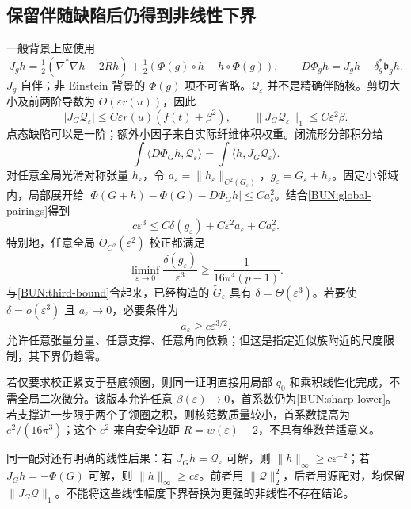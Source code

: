 \documentclass[UTF8,fontset=fandol,zihao=-4,oneside,openany]{ctexbook}
\theoremstyle{cjkplain}
\numberwithin{equation}{chapter}
\begin{document}
\subsection{保留伴随缺陷后仍得到非线性下界}
一般背景上应使用
\begin{equation}
 J_gh=\tfrac12(\nabla^*\nabla h-2\mathring Rh)
 +\tfrac12(\Phi(g)\circ h+h\circ\Phi(g)),
 \qquad D\Phi_g h=J_gh-\delta_g^*\mathfrak b_gh.
 \label{BUN:J-general}
\end{equation}
$J_g$ 自伴；非 Einstein 背景的 $\Phi(g)$ 项不可省略。$\mathcal Q_\varepsilon$ 并不是精确伴随核。剪切大小及前两阶导数为 $O(\varepsilon r(u))$，因此
\[
 |J_G\mathcal Q_\varepsilon|\le C\varepsilon r(u)(f(t)+\beta^2),
 \qquad\|J_G\mathcal Q_\varepsilon\|_1\le C\varepsilon^2\beta.
\]
点态缺陷可以是一阶；额外小因子来自实际纤维体积权重。闭流形分部积分给
\[
 \int\langle D\Phi_Gh,\mathcal Q_\varepsilon\rangle
 =\int\langle h,J_G\mathcal Q_\varepsilon\rangle.
\]
对任意全局光滑对称张量 $h_\varepsilon$，令
$a_\varepsilon=\|h_\varepsilon\|_{C^2(G_\varepsilon)}$，$g_\varepsilon=G_\varepsilon+h_\varepsilon$。固定小邻域内，局部展开给
$|\Phi(G+h)-\Phi(G)-D\Phi_Gh|\le Ca_\varepsilon^2$。结合\eqref{BUN:global-pairings}得到
\begin{equation}
 \boxed{c\varepsilon^3\le C\delta(g_\varepsilon)
 +C\varepsilon^2a_\varepsilon+Ca_\varepsilon^2.}
 \label{BUN:nonlinear-obstruction}
\end{equation}
特别地，任意全局 $O_{C^2}(\varepsilon^2)$ 校正都满足
\begin{equation}
 \boxed{\liminf_{\varepsilon\to0}\frac{\delta(g_\varepsilon)}{\varepsilon^3}
 \ge\frac1{16\pi^4(p-1)}.}
 \label{BUN:sharp-lower}
\end{equation}
与\eqref{BUN:third-bound}合起来，已经构造的 $\widetilde G_\varepsilon$ 具有 $\delta=\Theta(\varepsilon^3)$。若要使 $\delta=o(\varepsilon^3)$ 且 $a_\varepsilon\to0$，必要条件为
\begin{equation}
 a_\varepsilon\ge c\varepsilon^{3/2}.
 \label{BUN:critical-scale}
\end{equation}
允许任意张量分量、任意支撑、任意角向依赖；但这是指定近似族附近的尺度限制，其下界仍趋零。

若仅要求校正紧支于基底领圈，则同一证明直接用局部 $q_0$ 和乘积线性化完成，不需全局二次微分。该版本允许任意 $\beta(\varepsilon)\to0$，首系数仍为\eqref{BUN:sharp-lower}。若支撑进一步限于两个子领圈之积，则核范数质量较小，首系数提高为 $e^2/(16\pi^3)$；这个 $e^2$ 来自安全边距 $R=w(\varepsilon)-2$，不具有维数普适意义。

同一配对还有明确的线性后果：若 $J_Gh=\mathcal Q_\varepsilon$ 可解，则 $\|h\|_\infty\ge c\varepsilon^{-2}$；若 $J_Gh=-\Phi(G)$ 可解，则 $\|h\|_\infty\ge c\varepsilon$。前者用 $\|\mathcal Q\|_2^2$，后者用源配对，均保留 $\|J_G\mathcal Q\|_1$。不能将这些线性幅度下界替换为更强的非线性不存在结论。
\end{document}
